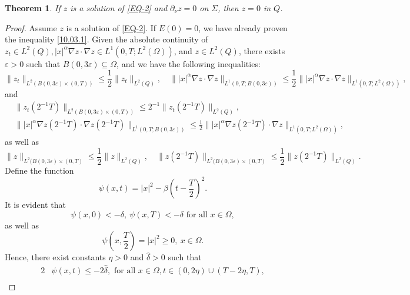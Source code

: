 \documentclass[11pt]{article}
\newtheorem{theorem}{Theorem}[section]
\numberwithin{equation}{section}
\def\s{\subseteq}
\def\e{\varepsilon }
\def\Om{\Omega}
\def\al{\alpha}
\def\be{\beta}
\def\de{\delta}
\def\ts{\times}
\def\f{\frac}
\def\wh{\widehat}
\begin{document}
		\begin{theorem}\label{Carleman3}
			If $z$ is  a solution of \eqref{EQ-2} and  $\partial_{\nu} z=0$ on $\Sigma$, then $z=0$ in $Q$.
		\end{theorem}
		\begin{proof}			
			Assume $z$ is a solution of \eqref{EQ-2}. If $E(0)=0$, we have already proven the inequality \eqref{10.03.1}. Given the absolute continuity of
			$z_t\in L^2(Q), |x|^\al\nabla z\cdot \nabla z\in L^1(0,T; L^2(\Om))$, and $z\in L^2(Q)$, there exists $\varepsilon>0$
			such that $B(0,3\varepsilon)\s \Om$, and we have the following inequalities:
			\begin{equation*}
				\|z_t\|_{L^2(B(0,3\e)\ts (0,T))}\leq \f{1}{2}\|z_t\|_{L^2(Q)},\quad \||x|^\al \nabla z\cdot \nabla z\|_{L^1(0,T; B(0,3\e))}\leq \f{1}{2}\||x|^\al \nabla z\cdot \nabla z\|_{L^1(0,T; L^2(\Om))},
			\end{equation*}
			and
			\begin{equation*}
				\begin{split}
					&\|z_t(2^{-1}T)\|_{L^2(B(0,3\e)\ts (0,T))}\leq 2^{-1}\|z_t(2^{-1}T)\|_{L^2(Q)}, \\
					&\||x|^\al \nabla z(2^{-1}T)\cdot \nabla z(2^{-1}T)\|_{L^1(0,T; B(0,3\e))}\leq \f{1}{2}\||x|^\al \nabla z(2^{-1}T)\cdot \nabla z\|_{L^1(0,T; L^2(\Om))},
				\end{split}
			\end{equation*}
			as well as
			\begin{equation*}
				\|z\|_{L^2(B(0,3\e)\ts (0,T)}\leq \f{1}{2}\|z\|_{L^2(Q)}, \quad \|z(2^{-1}T)\|_{L^2(B(0,3\e)\ts (0,T)}\leq \f{1}{2}\|z(2^{-1}T)\|_{L^2(Q)}.
			\end{equation*}
			Define the function
			\begin{equation*}
				\psi(x,t)=|x|^2-\be\left(t-\f{T}{2}\right)^2.
			\end{equation*}
			It is evident that
			\begin{equation*}
				\psi(x,0)<-\de, \ \psi(x,T)<-\de \mbox{ for all } x\in \Om,
			\end{equation*}
			as well as
			\begin{equation*}
				\psi\left(x,\f{T}{2}\right)=|x|^2\geq 0, \ x\in \Om.
			\end{equation*}
			Hence, there exist constants $\eta>0$ and $ \wh \de>0$ such that
			\begin{alignat}{2}
				& \psi(x,t)\leq -2\wh \de, \mbox{ for all } x\in \Om,  t\in (0,2\eta)\cup (T-2\eta, T), \label{10.03.2}\\

\end{alignat}
\end{proof}
\end{document}
